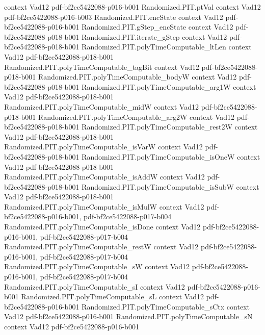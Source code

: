 \begin{theorem}
  {context}
  {Vad12}
  {pdf-bf2ce5422088-p016-b001}
\proofstep
  {Randomized.PIT.ptVal}
  {context}
  {Vad12}
  {pdf-bf2ce5422088-p016-b003}
\proofstep
  {Randomized.PIT.encState}
  {context}
  {Vad12}
  {pdf-bf2ce5422088-p016-b001}
\proofstep
  {Randomized.PIT.gStep_encState}
  {context}
  {Vad12}
  {pdf-bf2ce5422088-p018-b001}
\proofstep
  {Randomized.PIT.iterate_gStep}
  {context}
  {Vad12}
  {pdf-bf2ce5422088-p018-b001}
\proofstep
  {Randomized.PIT.polyTimeComputable_ltLen}
  {context}
  {Vad12}
  {pdf-bf2ce5422088-p018-b001}
\proofstep
  {Randomized.PIT.polyTimeComputable_tagBit}
  {context}
  {Vad12}
  {pdf-bf2ce5422088-p018-b001}
\proofstep
  {Randomized.PIT.polyTimeComputable_bodyW}
  {context}
  {Vad12}
  {pdf-bf2ce5422088-p018-b001}
\proofstep
  {Randomized.PIT.polyTimeComputable_arg1W}
  {context}
  {Vad12}
  {pdf-bf2ce5422088-p018-b001}
\proofstep
  {Randomized.PIT.polyTimeComputable_midW}
  {context}
  {Vad12}
  {pdf-bf2ce5422088-p018-b001}
\proofstep
  {Randomized.PIT.polyTimeComputable_arg2W}
  {context}
  {Vad12}
  {pdf-bf2ce5422088-p018-b001}
\proofstep
  {Randomized.PIT.polyTimeComputable_rest2W}
  {context}
  {Vad12}
  {pdf-bf2ce5422088-p018-b001}
\proofstep
  {Randomized.PIT.polyTimeComputable_isVarW}
  {context}
  {Vad12}
  {pdf-bf2ce5422088-p018-b001}
\proofstep
  {Randomized.PIT.polyTimeComputable_isOneW}
  {context}
  {Vad12}
  {pdf-bf2ce5422088-p018-b001}
\proofstep
  {Randomized.PIT.polyTimeComputable_isAddW}
  {context}
  {Vad12}
  {pdf-bf2ce5422088-p018-b001}
\proofstep
  {Randomized.PIT.polyTimeComputable_isSubW}
  {context}
  {Vad12}
  {pdf-bf2ce5422088-p018-b001}
\proofstep
  {Randomized.PIT.polyTimeComputable_isMulW}
  {context}
  {Vad12}
  {pdf-bf2ce5422088-p016-b001,
    pdf-bf2ce5422088-p017-b004}
\proofstep
  {Randomized.PIT.polyTimeComputable_isDone}
  {context}
  {Vad12}
  {pdf-bf2ce5422088-p016-b001,
    pdf-bf2ce5422088-p017-b004}
\proofstep
  {Randomized.PIT.polyTimeComputable_restW}
  {context}
  {Vad12}
  {pdf-bf2ce5422088-p016-b001,
    pdf-bf2ce5422088-p017-b004}
\proofstep
  {Randomized.PIT.polyTimeComputable_sW}
  {context}
  {Vad12}
  {pdf-bf2ce5422088-p016-b001,
    pdf-bf2ce5422088-p017-b004}
\proofstep
  {Randomized.PIT.polyTimeComputable_sI}
  {context}
  {Vad12}
  {pdf-bf2ce5422088-p016-b001}
\proofstep
  {Randomized.PIT.polyTimeComputable_sL}
  {context}
  {Vad12}
  {pdf-bf2ce5422088-p016-b001}
\proofstep
  {Randomized.PIT.polyTimeComputable_sCtx}
  {context}
  {Vad12}
  {pdf-bf2ce5422088-p016-b001}
\proofstep
  {Randomized.PIT.polyTimeComputable_sN}
  {context}
  {Vad12}
  {pdf-bf2ce5422088-p016-b001}

\end{theorem}
